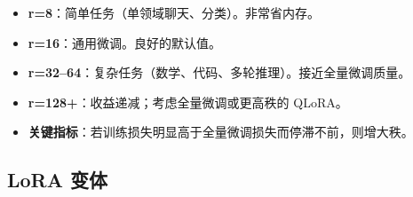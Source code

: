 \begin{warningbox}[秩选择经验法则]
\begin{itemize}
  \item \textbf{r=8}：简单任务（单领域聊天、分类）。非常省内存。
  \item \textbf{r=16}：通用微调。良好的默认值。
  \item \textbf{r=32--64}：复杂任务（数学、代码、多轮推理）。接近全量微调质量。
  \item \textbf{r=128+}：收益递减；考虑全量微调或更高秩的 QLoRA。
  \item \textbf{关键指标}：若训练损失明显高于全量微调损失而停滞不前，则增大秩。
\end{itemize}
\end{warningbox}

\subsection{LoRA 变体}
\label{lora-variants}

